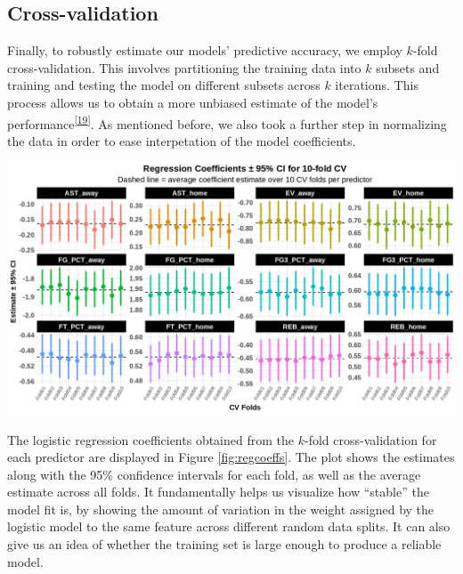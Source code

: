 \documentclass[
  12pt,
  a4paper,
]{article}
\let\origfigure\figure
\let\endorigfigure\endfigure
\renewenvironment{figure}[1][2] {
    \expandafter\origfigure\expandafter[H]
} {
    \endorigfigure
}
\begin{document}
\hypertarget{cross-validation}{%
\subsection{Cross-validation}\label{cross-validation}}

Finally, to robustly estimate our models' predictive accuracy, we employ \(k\)-fold cross-validation. This involves partitioning the training data into \(k\) subsets and training and testing the model on different subsets across \(k\) iterations. This process allows us to obtain a more unbiased estimate of the model's performance\textsuperscript{{[}\protect\hyperlink{ref-hastie-elements}{19}{]}}. As mentioned before, we also took a further step in normalizing the data in order to ease interpetation of the model coefficients.

\begin{figure}

{\centering \includegraphics[width=1\linewidth]{latex/plotspng/plot_11} 

}

\caption{Regression coefficients plot for 10-fold full model cross-validation}\label{fig:regcoeffs}
\end{figure}

The logistic regression coefficients obtained from the \(k\)-fold cross-validation for each predictor are displayed in Figure \ref{fig:regcoeffs}. The plot shows the estimates along with the 95\% confidence intervals for each fold, as well as the average estimate across all folds. It fundamentally helps us visualize how ``stable'' the model fit is, by showing the amount of variation in the weight assigned by the logistic model to the same feature across different random data splits. It can also give us an idea of whether the training set is large enough to produce a reliable model.
\end{document}
